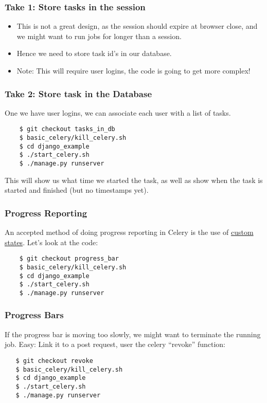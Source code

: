 \documentclass[9pt]{beamer}
\begin{document}
\begin{frame}[fragile]
  \frametitle{Take 1: Store tasks in the session}
  \begin{itemize}
  \item This is not a great design, as the session should expire at browser close, and we might want to run jobs for longer than a session.
    \pause
  \item Hence we need to store task id's in our database.
    \pause
  \item Note: This will require user logins, the code is going to get more complex!
  \end{itemize}
\end{frame}

\begin{frame}[fragile]
  \frametitle{Take 2: Store task in the Database}
  One we have user logins, we can associate each user with a list of tasks.
  \begin{verbatim}
    $ git checkout tasks_in_db
    $ basic_celery/kill_celery.sh
    $ cd django_example
    $ ./start_celery.sh
    $ ./manage.py runserver
  \end{verbatim}
  This will show us what time we started the task, as well as show when the task is started and finished (but no timestamps yet).
\end{frame}

\begin{frame}[fragile]
  \frametitle{Progress Reporting}
  An accepted method of doing progress reporting in Celery is the use of \href{http://docs.celeryproject.org/en/latest/userguide/tasks.html#custom-states}{custom states}. Let's look at the code:
  \begin{verbatim}
    $ git checkout progress_bar
    $ basic_celery/kill_celery.sh
    $ cd django_example
    $ ./start_celery.sh
    $ ./manage.py runserver
  \end{verbatim}
\end{frame}

\begin{frame}[fragile]
  \frametitle{Progress Bars}
  If the progress bar is moving too slowly, we might want to terminate the running job. Easy: Link it to a post request, user the celery ``revoke'' function:
  \begin{verbatim}
   $ git checkout revoke
   $ basic_celery/kill_celery.sh
   $ cd django_example
   $ ./start_celery.sh
   $ ./manage.py runserver
  \end{verbatim}
  
\end{frame}
\end{document}
